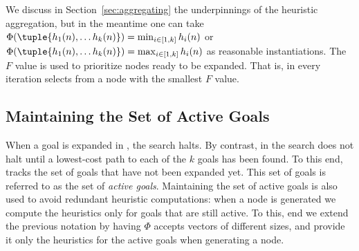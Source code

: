 


We discuss in Section~\ref{sec:aggregating} the underpinnings of the heuristic aggregation, but in the meantime one can take $\Phi(\tuple{h_1(n), \dots h_k(n)}) = \min_{i\in[1,k]} h_i(n)$ or $\Phi(\tuple{h_1(n), \dots h_k(n)}) = \max_{i\in[1,k]} h_i(n)$ as reasonable instantiations. 
The $F$ value is used to prioritize nodes ready to be expanded.
That is, in every iteration \kastar selects from \open a node with the smallest $F$ value. 










\subsection{Maintaining the Set of Active Goals}

When a goal is expanded in \astar, the search halts.
By contrast, in \kastar the search does not halt until a lowest-cost path to each of the $k$ goals has been found.
To this end, \kastar tracks the set of goals that have not been expanded yet. 
This set of goals is referred to as the set of \emph{active goals}.  
Maintaining the set of active goals is also used to avoid redundant heuristic computations: when a node is generated we compute the heuristics only for goals that are still active. %
To this, end we extend the previous notation by having $\Phi$ accepts vectors of different sizes, and provide it only the heuristics for the active goals when generating a node. 

